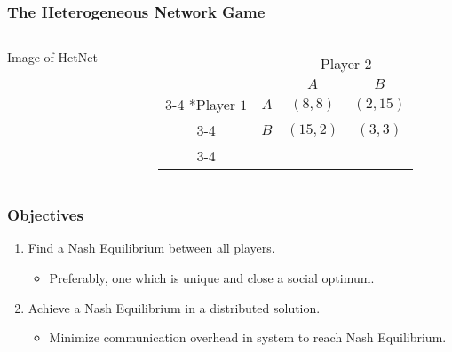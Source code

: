 \documentclass[10pt,tgadventor, onlymath]{beamer}
\begin{document}
\begin{frame}
\frametitle{The Heterogeneous Network Game}
\begin{columns}

\begin{column}{0.5\linewidth}
Image of HetNet
\end{column}
\begin{column}{0.5\linewidth}
\begin{table}
    \setlength{\extrarowheight}{2pt}
    \begin{tabular}{cc|c|c|}
      & \multicolumn{1}{c}{} & \multicolumn{2}{c}{Player $2$}\\
      & \multicolumn{1}{c}{} & \multicolumn{1}{c}{$A$}  & \multicolumn{1}{c}{$B$} \\\cline{3-4}
      \multirow{2}*{Player $1$}  & $A$ & $(8,8)$ & $(2,15)$ \\\cline{3-4}
      & $B$ & $(15,2)$ & $(3,3)$ \\\cline{3-4}
    \end{tabular}
  \end{table}
\end{column}
\end{columns}

\end{frame}

\begin{frame}
\frametitle{Objectives}
\begin{enumerate}
\item Find a Nash Equilibrium between all players.
\begin{itemize}
\item Preferably, one which is unique and close a social optimum.
\end{itemize}
\item Achieve a Nash Equilibrium in a distributed solution.
\begin{itemize}
\item Minimize communication overhead in system to reach Nash Equilibrium.
\end{itemize}
\end{enumerate}

\begin{center}
\end{center}
\end{frame}
\end{document}
